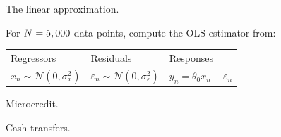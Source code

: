 
\begin{frame}{The linear approximation.}

For $N=5,000$ data points, compute the OLS estimator from:

\vspace{1em}
\begin{tabularx}{\textwidth}{YYY}
    Regressors  &   Residuals   &   Responses \\
    $x_n \sim \mathcal{N}(0, \sigma_x^2)$   &
    $\varepsilon_n \sim \mathcal{N}(0, \sigma_\varepsilon^2)$   &
    $y_n = \theta_0 x_n + \varepsilon_n$
\end{tabularx}
%

\SimGridNormalGraph{}

\end{frame}



\begin{frame}{Microcredit.}

{
\footnotesize
\MicrocreditProfitResultsTable{}
}

\end{frame}



\begin{frame}{Cash transfers.}

{
\footnotesize
\CashTransfersResultsTable{}
}

\end{frame}
